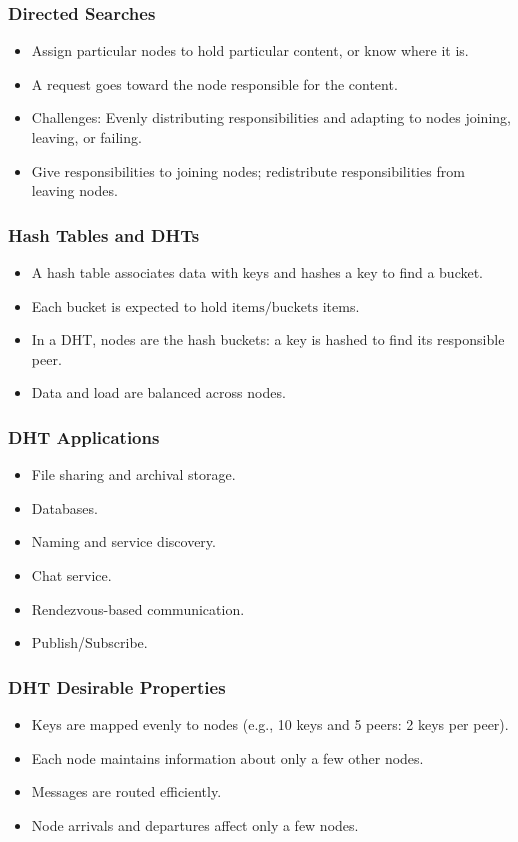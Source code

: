 \documentclass{article}
\begin{document}
\subsubsection{Directed Searches}
\begin{itemize}
    \item Assign particular nodes to hold particular content, or know where it is.
    \item A request goes toward the node responsible for the content.
    \item Challenges: Evenly distributing responsibilities and adapting to nodes joining, leaving, or failing.
    \item Give responsibilities to joining nodes; redistribute responsibilities from leaving nodes.
\end{itemize}

\subsubsection{Hash Tables and DHTs}
\begin{itemize}
    \item A hash table associates data with keys and hashes a key to find a bucket.
    \item Each bucket is expected to hold \(\text{items}/\text{buckets}\) items.
    \item In a DHT, nodes are the hash buckets: a key is hashed to find its responsible peer.
    \item Data and load are balanced across nodes.
\end{itemize}

\subsubsection{DHT Applications}
\begin{itemize}
    \item File sharing and archival storage.
    \item Databases.
    \item Naming and service discovery.
    \item Chat service.
    \item Rendezvous-based communication.
    \item Publish/Subscribe.
\end{itemize}

\subsubsection{DHT Desirable Properties}
\begin{itemize}
    \item Keys are mapped evenly to nodes (e.g., 10 keys and 5 peers: 2 keys per peer).
    \item Each node maintains information about only a few other nodes.
    \item Messages are routed efficiently.
    \item Node arrivals and departures affect only a few nodes.
\end{itemize}
\end{document}
